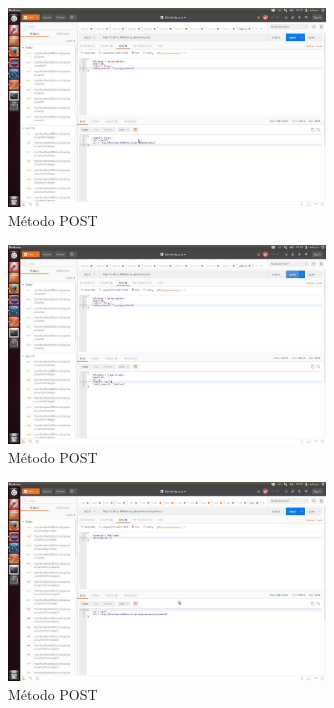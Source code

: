 \documentclass[12pt,a4paper, spanish]{article}
\begin{document}
\begin{figure}[H]
	\centering
	\includegraphics[width=0.75\textwidth]{images/captura9.jpg}
	\caption{Método POST}
\end{figure}

\begin{figure}[H]
	\centering
	\includegraphics[width=0.75\textwidth]{images/captura10.jpg}
	\caption{Método POST}
\end{figure}

\begin{figure}[H]
	\centering
	\includegraphics[width=0.75\textwidth]{images/captura11.jpg}
	\caption{Método POST}
\end{figure}
\end{document}

